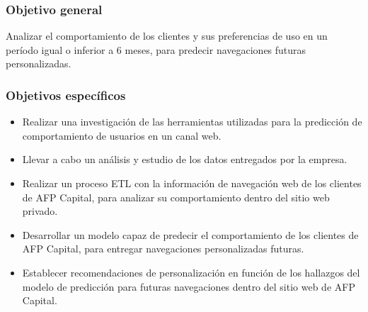 \subsubsection{Objetivo general}
Analizar el comportamiento de los clientes y sus preferencias de uso en un período igual o inferior a 6 meses, para predecir navegaciones futuras personalizadas. 

\subsubsection{Objetivos específicos }
\begin{itemize}
    \item Realizar una investigación de las herramientas utilizadas para la predicción de comportamiento de usuarios en un canal web.
    \item Llevar a cabo un análisis y estudio de los datos entregados por la empresa. 
    \item Realizar un proceso ETL con la información de navegación web de los clientes de AFP Capital, para analizar su comportamiento dentro del sitio web privado. 
    \item Desarrollar un modelo capaz de predecir el comportamiento de los clientes de AFP Capital, para entregar navegaciones personalizadas futuras.
    \item Establecer recomendaciones de personalización en función de los hallazgos del modelo de predicción para futuras navegaciones dentro del sitio web de AFP Capital.
\end{itemize}